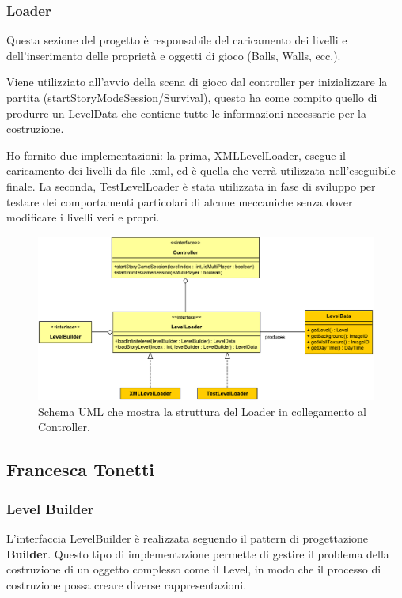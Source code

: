 \documentclass[a4paper,12pt]{report}
\begin{document}
\subsubsection*{Loader}
Questa sezione del progetto è responsabile del caricamento dei livelli e dell'inserimento delle proprietà e oggetti di gioco (Balls, Walls, ecc.).

Viene utilizziato all'avvio della scena di gioco dal controller per inizializzare la partita (startStoryModeSession/Survival), questo ha come compito quello di produrre un LevelData che contiene tutte le informazioni necessarie per la costruzione.

Ho fornito due implementazioni: la prima, XMLLevelLoader, esegue il caricamento dei livelli da file .xml, ed è quella che verrà utilizzata nell'eseguibile finale. La seconda, TestLevelLoader è stata utilizzata in fase di sviluppo per testare dei comportamenti particolari di alcune meccaniche senza dover modificare i livelli veri e propri.
\begin{figure}[H]
\includegraphics[width=\linewidth]{img/loader}
\caption{Schema UML che mostra la struttura del Loader in collegamento al Controller.}
\label{img:loader}
\end{figure}


\subsection*{Francesca Tonetti}
\subsubsection*{Level Builder}
L'interfaccia LevelBuilder è realizzata seguendo il pattern di progettazione \textbf{Builder}.
Questo tipo di implementazione permette di gestire il problema della costruzione di un oggetto complesso come il Level, in modo che il processo di costruzione possa creare diverse rappresentazioni.
\end{document}
